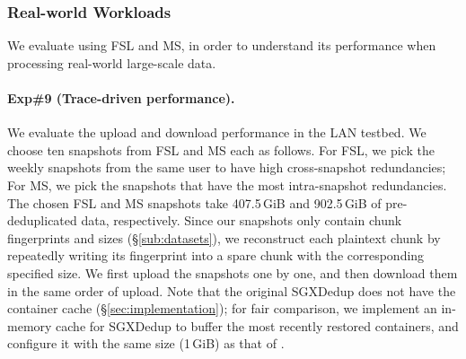 \subsubsection{Real-world Workloads}
\label{subsub:real}
We evaluate \prototype using FSL and MS, in order to understand its performance when processing real-world large-scale data.

\paragraph{Exp\#9 (Trace-driven performance).}
We evaluate the upload and download performance in the LAN testbed. We choose ten snapshots from FSL and MS each as follows. For FSL, we pick the weekly snapshots from the same user to have high cross-snapshot redundancies; For MS, we pick the snapshots that have the most intra-snapshot redundancies. The chosen FSL and MS snapshots take 407.5\,GiB and 902.5\,GiB of pre-deduplicated data, respectively. Since our snapshots only contain chunk fingerprints and sizes (\S\ref{sub:datasets}), we reconstruct each plaintext chunk by repeatedly writing its fingerprint into a spare chunk with the corresponding specified size. We first upload the snapshots one by one, and then download them in the same order of upload. Note that the original SGXDedup \cite{ren21} does not have the container cache (\S\ref{sec:implementation}); for fair comparison, we implement an in-memory cache for SGXDedup to buffer the most recently restored containers, and configure it with the same size (1\,GiB) as that of \prototype.


